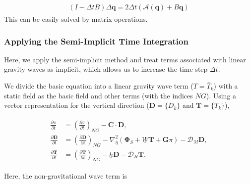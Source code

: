 \begin{eqnarray}
\begin{aligned}
( I - \Delta t B ) \Delta {\mathbf q}
= 2 \Delta t \left( {\mathcal A}({\mathbf q})
+ B {\mathbf q} \right)
\end{aligned}
\end{eqnarray} This can be easily solved by matrix operations.

\hypertarget{applying-the-semi-implicit-time-integration}{%
\subsubsection{Applying the Semi-Implicit Time Integration}\label{applying-the-semi-implicit-time-integration}}

Here, we apply the semi-implicit method and treat terms associated with linear gravity waves as implicit, which allows us to increase the time step \(\Delta t\).

We divide the basic equation into a linear gravity wave term (\(T=\bar{T}_k\)) with a static field as the basic field and other terms (with the indices \(NG\)). Using a vector representation for the
vertical direction (\({\mathbf{D}}=\{ D_{k} \}\) and \({\mathbf{T}}=\{ T_{k} \}\)),

\begin{eqnarray}
\begin{aligned}
\frac{\partial \pi}{\partial t} &=
\left( \frac{\partial \pi}{\partial t} \right)_{NG}
- {\mathbf{C}} \cdot {\mathbf{D}}, \\
\frac{\partial {\mathbf{D}}}{\partial t} &=
\left( \frac{\partial {\mathbf{D}}}{\partial t} \right)_{NG}
- \nabla^{2}_{\eta} ( {\mathbf{\Phi}}_{S}
+ \underline{W} {\mathbf{T}}
+ {\mathbf{G}} \pi )
- {\mathcal D}_M {\mathbf{D}} , \\
\frac{\partial {\mathbf{T}}}{\partial t}
&=   \left( \frac{\partial {\mathbf{T}}}
{\partial t}       \right)_{NG}
- \underline{h} {\mathbf{D}}
- {\mathcal D}_H {\mathbf{T}}.
\end{aligned}
\end{eqnarray}

Here, the non-gravitational wave term is

